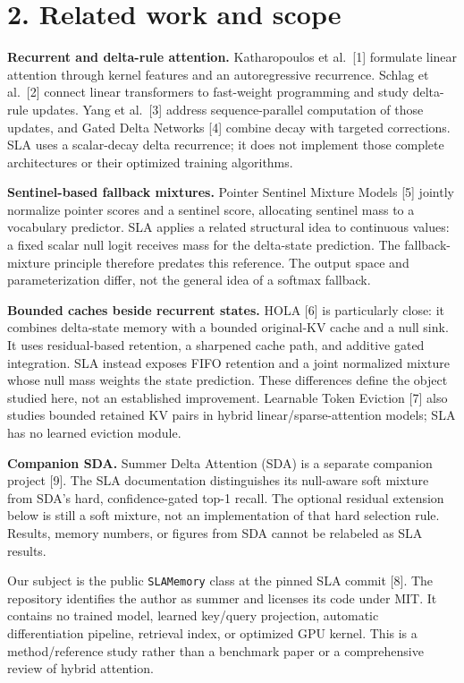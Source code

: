 \documentclass[11pt,a4paper]{article}
\begin{document}
\section{2. Related work and scope}\label{related-work-and-scope}

\textbf{Recurrent and delta-rule attention.} Katharopoulos et al.~{[}1{]} formulate linear attention through kernel features and an autoregressive recurrence. Schlag et al.~{[}2{]} connect linear transformers to fast-weight programming and study delta-rule updates. Yang et al.~{[}3{]} address sequence-parallel computation of those updates, and Gated Delta Networks {[}4{]} combine decay with targeted corrections. SLA uses a scalar-decay delta recurrence; it does not implement those complete architectures or their optimized training algorithms.

\textbf{Sentinel-based fallback mixtures.} Pointer Sentinel Mixture Models {[}5{]} jointly normalize pointer scores and a sentinel score, allocating sentinel mass to a vocabulary predictor. SLA applies a related structural idea to continuous values: a fixed scalar null logit receives mass for the delta-state prediction. The fallback-mixture principle therefore predates this reference. The output space and parameterization differ, not the general idea of a softmax fallback.

\textbf{Bounded caches beside recurrent states.} HOLA {[}6{]} is particularly close: it combines delta-state memory with a bounded original-KV cache and a null sink. It uses residual-based retention, a sharpened cache path, and additive gated integration. SLA instead exposes FIFO retention and a joint normalized mixture whose null mass weights the state prediction. These differences define the object studied here, not an established improvement. Learnable Token Eviction {[}7{]} also studies bounded retained KV pairs in hybrid linear/sparse-attention models; SLA has no learned eviction module.

\textbf{Companion SDA.} Summer Delta Attention (SDA) is a separate companion project {[}9{]}. The SLA documentation distinguishes its null-aware soft mixture from SDA's hard, confidence-gated top-1 recall. The optional residual extension below is still a soft mixture, not an implementation of that hard selection rule. Results, memory numbers, or figures from SDA cannot be relabeled as SLA results.

Our subject is the public \texttt{SLAMemory} class at the pinned SLA commit {[}8{]}. The repository identifies the author as summer and licenses its code under MIT. It contains no trained model, learned key/query projection, automatic differentiation pipeline, retrieval index, or optimized GPU kernel. This is a method/reference study rather than a benchmark paper or a comprehensive review of hybrid attention.
\end{document}

